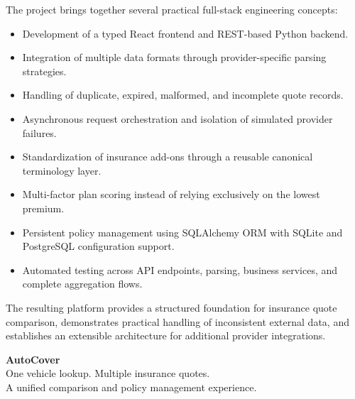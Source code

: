 \documentclass[11pt,a4paper]{article}
\begin{document}
The project brings together several practical full-stack
engineering concepts:

\begin{itemize}

    \item Development of a typed React frontend and REST-based
    Python backend.

    \item Integration of multiple data formats through
    provider-specific parsing strategies.

    \item Handling of duplicate, expired, malformed, and
    incomplete quote records.

    \item Asynchronous request orchestration and isolation
    of simulated provider failures.

    \item Standardization of insurance add-ons through a
    reusable canonical terminology layer.

    \item Multi-factor plan scoring instead of relying
    exclusively on the lowest premium.

    \item Persistent policy management using SQLAlchemy ORM
    with SQLite and PostgreSQL configuration support.

    \item Automated testing across API endpoints, parsing,
    business services, and complete aggregation flows.

\end{itemize}

The resulting platform provides a structured foundation for
insurance quote comparison, demonstrates practical handling
of inconsistent external data, and establishes an extensible
architecture for additional provider integrations.

\vspace{0.5cm}

\begin{center}
\begin{tcolorbox}[
    width=0.9\textwidth,
    colback=Navy,
    colframe=Navy,
    arc=3mm,
    boxrule=0pt,
    left=5mm,
    right=5mm,
    top=4mm,
    bottom=4mm
]
\centering
{\Large\bfseries\color{white} AutoCover}\\[5pt]
{\normalsize\color{white}
One vehicle lookup. Multiple insurance quotes.\\
A unified comparison and policy management experience.
}
\end{tcolorbox}
\end{center}
\end{document}
